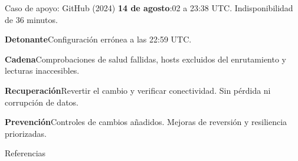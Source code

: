 \documentclass[aspectratio=169,12pt]{beamer}
\begin{document}

\appendix
\begin{frame}{Caso de apoyo: GitHub (2024)}
\small
\textbf{14 de agosto}:02 a 23:38 UTC. Indisponibilidad de 36 minutos.\par\smallskip
\textbf{Detonante}\quad Configuración errónea a las 22:59 UTC.\par\smallskip
\textbf{Cadena}\quad Comprobaciones de salud fallidas, hosts excluidos del enrutamiento y lecturas inaccesibles.\par\smallskip
\textbf{Recuperación}\quad Revertir el cambio y verificar conectividad. Sin pérdida ni corrupción de datos.\par\smallskip
\textbf{Prevención}\quad Controles de cambios añadidos. Mejoras de reversión y resiliencia priorizadas. \cite{githubAgosto2024}
\end{frame}
\begin{frame}[allowframebreaks]{Referencias}
\renewcommand{\bibfont}{\footnotesize}
\printbibliography[heading=none]
\end{frame}
\end{document}
